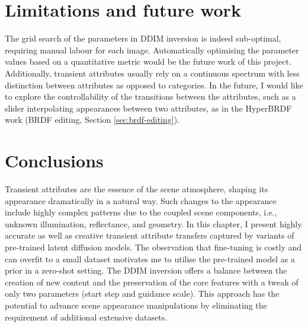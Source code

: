







\section{Limitations and future work}
The grid search of the parameters in DDIM inversion is indeed sub-optimal, requiring manual labour for each image. Automatically optimising the parameter values based on a quantitative metric would be the future work of this project. Additionally, transient attributes usually rely on a continuous spectrum with less distinction between attributes as opposed to categories. In the future, I would like to explore the controllability of the transitions between the attributes, such as a slider interpolating appearances between two attributes, as in the HyperBRDF work (BRDF editing, Section \ref{sec:brdf-editing}).

\section{Conclusions}

Transient attributes are the essence of the scene atmosphere, shaping its appearance dramatically in a natural way. Such changes to the appearance include highly complex patterns due to the coupled scene components, i.e., unknown illumination, reflectance, and geometry. In this chapter, I present highly accurate as well as creative transient attribute transfers captured by variants of pre-trained latent diffusion models. The observation that fine-tuning is costly and can overfit to a small dataset motivates me to utilise the pre-trained model as a prior in a zero-shot setting. The DDIM inversion offers a balance between the creation of new content and the preservation of the core features with a tweak of only two parameters (start step and guidance scale). This approach has the potential to advance scene appearance manipulations by eliminating the requirement of additional extensive datasets. 


